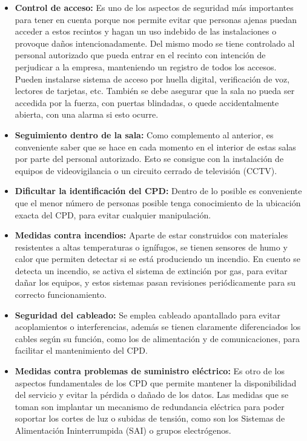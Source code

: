 \begin{itemize}
	\item \textbf{Control de acceso:} Es uno de los aspectos de seguridad más importantes para tener en cuenta porque nos permite evitar que personas ajenas puedan acceder a estos recintos y hagan un uso indebido de las instalaciones o provoque daños intencionadamente. Del mismo modo se tiene controlado al personal autorizado que pueda entrar en el recinto con intención de perjudicar a la empresa, manteniendo un registro de todos los accesos. Pueden instalarse sistema de acceso por huella digital, verificación de voz, lectores de tarjetas, etc. También se debe asegurar que la sala no pueda ser accedida por la fuerza, con puertas blindadas, o quede accidentalmente abierta, con una alarma si esto ocurre.
	\item \textbf{Seguimiento dentro de la sala:} Como complemento al anterior, es conveniente saber que se hace en cada momento en el interior de estas salas por parte del personal autorizado. Esto se consigue con la instalación de equipos de videovigilancia o un circuito cerrado de televisión (CCTV).
	\item \textbf{Dificultar la identificación del CPD:} Dentro de lo posible es conveniente que el menor número de personas posible tenga conocimiento de la ubicación exacta del CPD, para evitar cualquier manipulación.
	\item \textbf{Medidas contra incendios:} Aparte de estar construidos con materiales resistentes a altas temperaturas o ignífugos, se tienen sensores de humo y calor que permiten detectar si se está produciendo un incendio. En cuento se detecta un incendio, se activa el sistema de extinción por gas, para evitar dañar los equipos, y estos sistemas pasan revisiones periódicamente para su correcto funcionamiento.
	\item \textbf{Seguridad del cableado:} Se emplea cableado apantallado para evitar acoplamientos o interferencias, además se tienen claramente diferenciados los cables según su función, como los de alimentación y de comunicaciones, para facilitar el mantenimiento del CPD.
	\item \textbf{Medidas contra problemas de suministro eléctrico:} Es otro de los aspectos fundamentales de los CPD que permite mantener la disponibilidad del servicio y evitar la pérdida o dañado de los datos. Las medidas que se toman son implantar un mecanismo de redundancia eléctrica para poder soportar los cortes de luz o subidas de tensión, como son los Sistemas de Alimentación Ininterrumpida (SAI) o grupos electrógenos.

\end{itemize}
